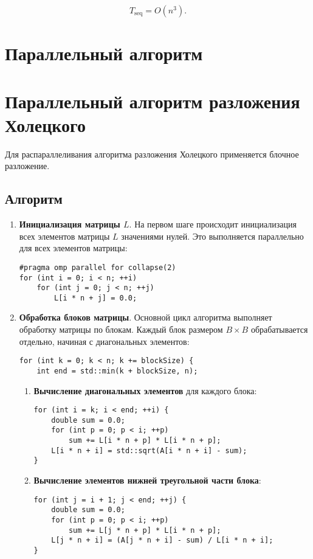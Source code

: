 \documentclass[12pt, russian]{extarticle}
\begin{document}
\begin{spacing}{1.5}
\[
T_{\text{seq}} = O(n^3).
\]

\newpage
\section{Параллельный алгоритм}

\section*{Параллельный алгоритм разложения Холецкого}

Для распараллеливания алгоритма разложения Холецкого  применяется блочное разложение.

\subsection*{Алгоритм}

\begin{enumerate}
\item
\textbf{Инициализация матрицы \( L \)}. На первом шаге происходит инициализация всех элементов матрицы \( L \) значениями нулей. Это выполняется параллельно для всех элементов матрицы:
\begin{verbatim}
#pragma omp parallel for collapse(2)
for (int i = 0; i < n; ++i)
    for (int j = 0; j < n; ++j)
        L[i * n + j] = 0.0;
\end{verbatim}

\item
\textbf{Обработка блоков матрицы}. Основной цикл алгоритма выполняет обработку матрицы по блокам. Каждый блок размером \( B \times B \) обрабатывается отдельно, начиная с диагональных элементов:
\begin{verbatim}
for (int k = 0; k < n; k += blockSize) {
    int end = std::min(k + blockSize, n);
\end{verbatim}

\begin{enumerate}
\item 
\textbf{Вычисление диагональных элементов} для каждого блока:
\begin{verbatim}
for (int i = k; i < end; ++i) {
    double sum = 0.0;
    for (int p = 0; p < i; ++p)
        sum += L[i * n + p] * L[i * n + p];
    L[i * n + i] = std::sqrt(A[i * n + i] - sum);
}
\end{verbatim}

\item
\textbf{Вычисление элементов нижней треугольной части блока}:
\begin{verbatim}
for (int j = i + 1; j < end; ++j) {
    double sum = 0.0;
    for (int p = 0; p < i; ++p)
        sum += L[j * n + p] * L[i * n + p];
    L[j * n + i] = (A[j * n + i] - sum) / L[i * n + i];
}
\end{verbatim}


\end{enumerate}
\end{enumerate}
\end{spacing}
\end{document}
